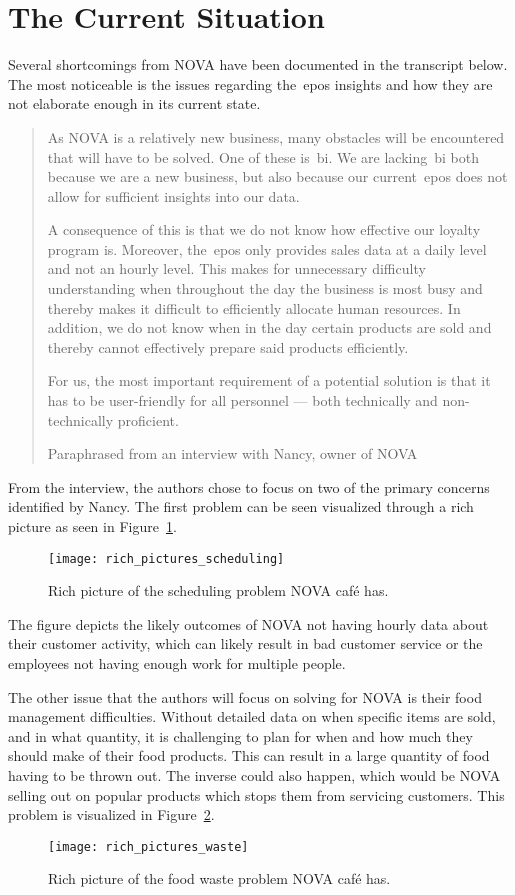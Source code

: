 \section{The Current Situation}\label{sec:the-current-situation}

Several shortcomings from NOVA have been documented in the transcript below.
The most noticeable is the issues regarding the~\acrfull{epos} insights and how they are not elaborate enough in its
current state.

\blockquote[Paraphrased from an interview with Nancy, owner of NOVA]{As NOVA is a relatively new business, many
obstacles will be encountered that will have to be solved.
One of these is~\acrfull{bi}.
We are lacking~\acrshort{bi} both because we are a new business, but also because our current~\acrshort{epos} does not
allow for sufficient insights into our data.

A consequence of this is that we do not know how effective our loyalty program is.
Moreover, the~\acrshort{epos} only provides sales data at a daily level and not an hourly level.
This makes for unnecessary difficulty understanding when throughout the day the business is most busy and thereby makes
it difficult to efficiently allocate human resources.
In addition, we do not know when in the day certain products are sold and thereby cannot effectively prepare said
products efficiently.

For us, the most important requirement of a potential solution is that it has to be user-friendly for all personnel —
both technically and non-technically proficient.}

From the interview, the authors chose to focus on two of the primary concerns identified by Nancy.
The first problem can be seen visualized through a rich picture as seen in Figure~\ref{fig:pda-scheduling-problem}.
\begin{figure}[H]
    \centering
    \texttt{[image: rich\_pictures\_scheduling]}
    \caption{Rich picture of the scheduling problem NOVA café has.}\label{fig:pda-scheduling-problem}
\end{figure}
The figure depicts the likely outcomes of NOVA not having hourly data about their customer activity,
which can likely result in bad customer service or the employees not having enough work for multiple people.

The other issue that the authors will focus on solving for NOVA is their food management difficulties.
Without detailed data on when specific items are sold, and in what quantity, it is challenging to plan
for when and how much they should make of their food products.
This can result in a large quantity of food having to be thrown out.
The inverse could also happen, which would be NOVA selling out on popular products which stops them
from servicing customers.
This problem is visualized in Figure~\ref{fig:pda-waste-problem}.

\begin{figure}[H]
    \centering
    \texttt{[image: rich\_pictures\_waste]}
    \caption{Rich picture of the food waste problem NOVA café has.}\label{fig:pda-waste-problem}
\end{figure}
